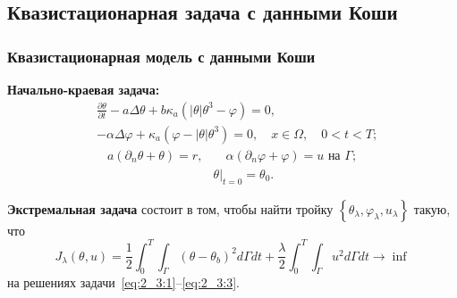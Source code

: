 \subsection{Квазистационарная задача с данными Коши}\label{subsec:qst_koshi}
\begin{frame}
    \frametitle{Квазистационарная модель с данными Коши}
    \textbf{Начально-краевая задача:}
    \begin{equation}
        \label{eq:2_3:1}
        \begin{split}
            & \frac{\partial \theta}{\partial t} - a \Delta \theta
            + b \kappa_{a} \left(|\theta| \theta^{3}-\varphi\right) = 0,\\
            & - \alpha \Delta \varphi
            + \kappa_{a} \left(\varphi-|\theta| \theta^{3}\right) = 0,
            \quad x \in \Omega, \quad 0 < t < T;
        \end{split}
    \end{equation}
    \begin{align}
        a \left(\partial_{n} \theta+\theta\right)=r,
        & \quad \alpha\left(\partial_{n} \varphi
        + \varphi\right) = u \text { на } \Gamma;  \label{eq:2_3:2}\\
        & \left.\theta\right|_{t=0} = \theta_{0}. \label{eq:2_3:3}
    \end{align}


    \textbf{Экстремальная задача} состоит в том, чтобы найти тройку
    $\left\{\theta_{\lambda}, \varphi_{\lambda}, u_{\lambda}\right\}$ такую, что
    \begin{equation}
        \label{eq:2_3:4}
        J_{\lambda}(\theta, u)=\frac{1}{2} \int_{0}^{T}
        \int_{\Gamma}\left(\theta-\theta_{b}\right)^{2} d \Gamma d t+\frac{\lambda}{2}
        \int_{0}^{T} \int_{\Gamma} u^{2} d \Gamma d t \rightarrow \inf
    \end{equation}
    на решениях задачи~\eqref{eq:2_3:1}--\eqref{eq:2_3:3}.
\end{frame}

